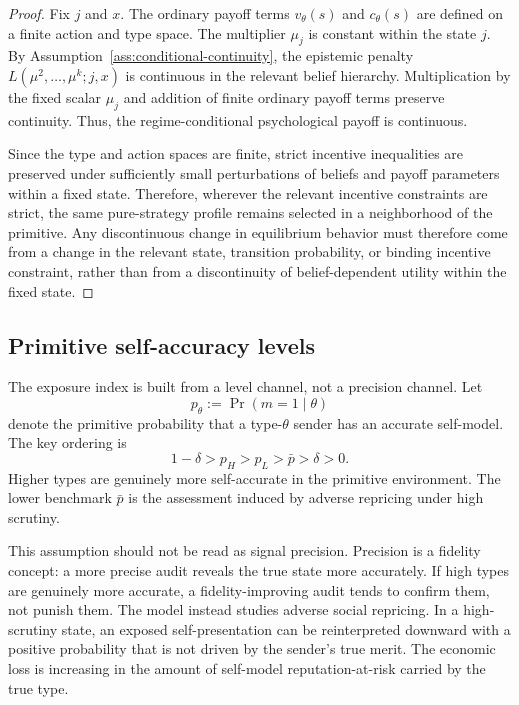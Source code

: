 \begin{proof}
Fix $j$ and $x$. The ordinary payoff terms $v_\theta(s)$ and $c_\theta(s)$ are defined on a finite action and type space. The multiplier $\mu_j$ is constant within the state $j$. By Assumption~\ref{ass:conditional-continuity}, the epistemic penalty $L(\mu^2,\ldots,\mu^k;j,x)$ is continuous in the relevant belief hierarchy. Multiplication by the fixed scalar $\mu_j$ and addition of finite ordinary payoff terms preserve continuity. Thus, the regime-conditional psychological payoff is continuous.

Since the type and action spaces are finite, strict incentive inequalities are preserved under sufficiently small perturbations of beliefs and payoff parameters within a fixed state. Therefore, wherever the relevant incentive constraints are strict, the same pure-strategy profile remains selected in a neighborhood of the primitive. Any discontinuous change in equilibrium behavior must therefore come from a change in the relevant state, transition probability, or binding incentive constraint, rather than from a discontinuity of belief-dependent utility within the fixed state.
\end{proof}

\subsection{Primitive self-accuracy levels}

The exposure index is built from a level channel, not a precision channel. Let
\[
p_\theta:=\Pr(m=1\mid \theta)
\]
denote the primitive probability that a type-$\theta$ sender has an accurate self-model. The key ordering is
\[
1-\delta>p_H>p_L>\bar p>\delta>0.
\]
Higher types are genuinely more self-accurate in the primitive environment. The lower benchmark $\bar p$ is the assessment induced by adverse repricing under high scrutiny.

This assumption should not be read as signal precision. Precision is a fidelity concept: a more precise audit reveals the true state more accurately. If high types are genuinely more accurate, a fidelity-improving audit tends to confirm them, not punish them. The model instead studies adverse social repricing. In a high-scrutiny state, an exposed self-presentation can be reinterpreted downward with a positive probability that is not driven by the sender's true merit. The economic loss is increasing in the amount of self-model reputation-at-risk carried by the true type.

